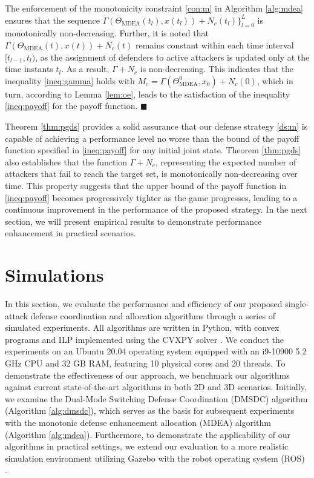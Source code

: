 \documentclass[journal]{IEEEtran}
\newenvironment{Proof}{\noindent{\em Proof:\/}}{\hfill $\blacksquare$\par}
\newcommand{\1}{\mathbf{1}}
\begin{document}
\begin{Proof}
The enforcement of the monotonicity constraint \eqref{con:m} in Algorithm \ref{alg:mdea} ensures that the sequence $\Gamma(\Theta_{\text{MDEA}}(t_l),x(t_l))+N_c(t_l)\}_{l=0}^L$ is monotonically non-decreasing. Further, it is noted that $\Gamma(\Theta_{\text{MDEA}}(t),x(t))+N_c(t)$ remains constant within each time interval $[t_{l-1},t_l)$, as the assignment of defenders to active attackers is updated only at the time instants $t_l$. As a result, $\Gamma+N_c$ is non-decreasing. This indicates that the inequality \eqref{ineq:gamma} holds with $M_c=\Gamma(\Theta_{\text{MDEA}}^0,x_0)+N_c(0)$, which in turn, according to Lemma \ref{lem:oe}, leads to the satisfaction of the inequality \eqref{ineq:payoff} for the payoff function. 
\end{Proof}

Theorem \ref{thm:pgds} provides a solid assurance that our defense strategy \eqref{ds:m} is capable of achieving a performance level no worse than the bound of the payoff function specified in \eqref{ineq:payoff} for any initial joint state. Theorem \ref{thm:pgds} also establishes that the function $\Gamma+N_c$, representing the expected number of attackers that fail to reach the target set, is monotonically non-decreasing over time. This property suggests that the upper bound of the payoff function in \eqref{ineq:payoff} becomes progressively tighter as the game progresses, leading to a continuous improvement in the performance of the proposed strategy. In the next section, we will present empirical results to demonstrate performance enhancement in practical scenarios.

\section{Simulations}\label{sec:5}

In this section, we evaluate the performance and efficiency of our proposed single-attack defense coordination and allocation algorithms through a series of simulated experiments. All algorithms are written in Python, with convex programs and ILP implemented using the CVXPY solver \cite{diamond2016cvxpy}. We conduct the experiments on an Ubuntu 20.04 operating system equipped with an i9-10900 5.2 GHz CPU and 32 GB RAM, featuring 10 physical cores and 20 threads. To demonstrate the effectiveness of our approach, we benchmark our algorithms against current state-of-the-art algorithms in both 2D and 3D scenarios. Initially, we examine the Dual-Mode Switching Defense Coordination (DMSDC) algorithm (Algorithm \ref{alg:dmsdc}), which serves as the basis for subsequent experiments with the monotonic defense enhancement allocation (MDEA) algorithm (Algorithm \ref{alg:mdea}). Furthermore, to demonstrate the applicability of our algorithms in practical settings, we extend our evaluation to a more realistic simulation environment utilizing Gazebo with the robot operating system (ROS) \cite{koenig2004design}.
\end{document}
